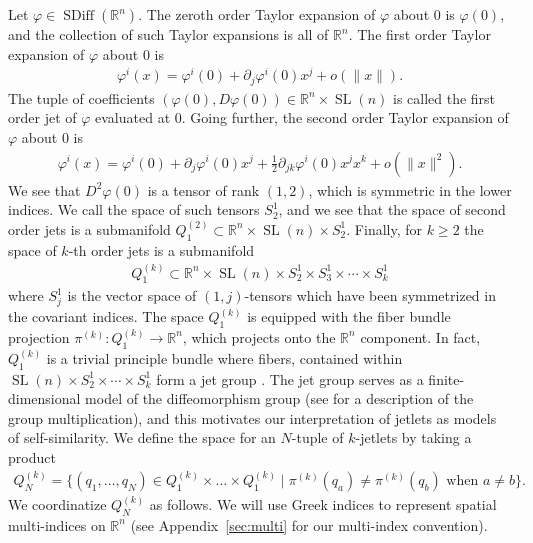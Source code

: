 \documentclass[12pt]{amsart}
\newcommand{\R}{\ensuremath{\mathbb{R}}}
\DeclareMathOperator{\SDiff}{SDiff}
\DeclareMathOperator{\SL}{SL}
\begin{document}
  Let $\varphi \in \SDiff(\R^n)$.
  The zeroth order Taylor expansion of $\varphi$ about $0$
  is $\varphi(0)$, and the collection of such Taylor
  expansions is all of $\R^n$.
  The first order Taylor expansion of $\varphi$ about $0$ is
  \begin{align*}
    \varphi^i( x) = \varphi^i(0) + \partial_j \varphi^i(0) x^j + o( \|x\|).
  \end{align*}
  The tuple of coefficients $(\varphi(0) , D\varphi(0) ) \in \R^n \times \SL(n)$ is
  called the first order jet of $\varphi$ evaluated at $0$.
  Going further, the second order Taylor expansion of $\varphi$ about $0$
  is
  \begin{align*}
    \varphi^i(x) = \varphi^i(0) + \partial_j \varphi^i(0) x^j + 
    \frac{1}{2} \partial_{jk} \varphi^i(0) x^j x^k + o( \| x\|^2).
  \end{align*}
  We see that $D^2\varphi(0)$ is a tensor of rank $(1,2)$, which is
  symmetric in the lower indices.
  We call the space of such tensors $S^1_2$,
  and we see that the space of second order jets is a submanifold $Q^{(2)}_1 \subset \R^n \times \SL(n) \times S^1_2$.
  Finally, for $k \geq 2$ the space of $k$-th order jets is a submanifold
  \begin{align*}
    Q_1^{(k)} \subset \R^n \times \SL(n) \times S^1_2 \times S^1_3 \times \cdots\times S^1_k
  \end{align*}
  where $S^1_j$ is the vector space of $(1,j)$-tensors which
  have been symmetrized in the covariant indices.
  The space $Q_1^{(k)}$ is equipped with the fiber bundle
  projection $\pi^{(k)} : Q_1^{(k)} \to \R^n$,
  which projects onto the $\R^n$ component.
  In fact, $Q_1^{(k)}$ is a trivial principle bundle
  where fibers, contained within $\SL(n) \times S^1_2 \times \cdots \times S^1_k$
  form a jet group \cite{JacobsRatiuDesbrun2013}.
  The jet group serves as a finite-dimensional model of the diffeomorphism group (see \cite[Chapter 4]{KMS99} for a description of the group multiplication),
  and this motivates our interpretation of jetlets as models of self-similarity.
  We define the space for an $N$-tuple of $k$-jetlets by taking a product
  \begin{align*}
    Q^{(k)}_N = \{ (q_1,\dots, q_N) \in Q_1^{(k)} \times \dots \times Q_1^{(k)}
    \mid \pi^{(k)}(q_a) \neq \pi^{(k)}(q_b) \text{ when } a \neq b \}.
  \end{align*}
  We coordinatize $Q^{(k)}_N$ as follows.
  We will use Greek indices to represent spatial
  multi-indices on $\R^n$ (see Appendix~\ref{sec:multi} for our multi-index convention).
\end{document}
